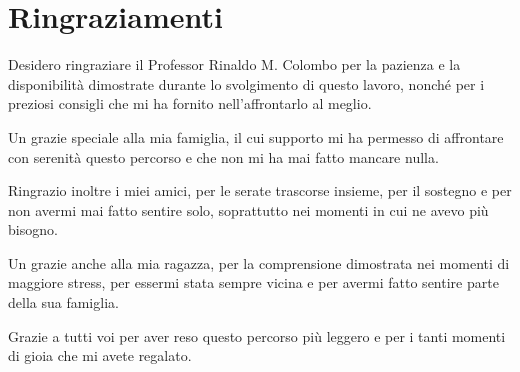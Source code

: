\section*{Ringraziamenti}
Desidero ringraziare il Professor Rinaldo M. Colombo per la pazienza e la disponibilità dimostrate durante lo svolgimento di questo lavoro, nonché per i preziosi consigli che mi ha fornito nell'affrontarlo al meglio.

Un grazie speciale alla mia famiglia, il cui supporto mi ha permesso di affrontare con serenità questo percorso e che non mi ha mai fatto mancare nulla. 

Ringrazio inoltre i miei amici, per le serate trascorse insieme, per il sostegno e per non avermi mai fatto sentire solo, soprattutto nei momenti in cui ne avevo più bisogno.

Un grazie anche alla mia ragazza, per la comprensione dimostrata nei momenti di maggiore stress, per essermi stata sempre vicina e per avermi fatto sentire parte della sua famiglia.

Grazie a tutti voi per aver reso questo percorso più leggero e per i tanti momenti di gioia che mi avete regalato.
